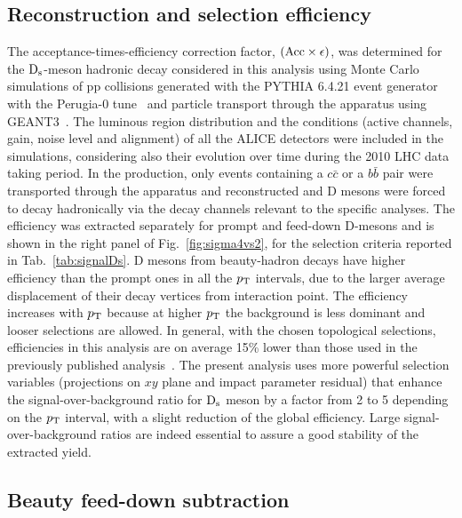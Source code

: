\subsection{Reconstruction and selection efficiency}
\label{sec:Effpp}
The acceptance-times-efficiency correction factor, 
$(\rm Acc \times \epsilon)$, was determined for the ${\rm D_s}$-meson
hadronic decay considered in this analysis using Monte Carlo simulations 
of pp collisions generated with the PYTHIA 6.4.21 event generator~\cite{Sjostrand:2006za} with the 
Perugia-0 tune~\cite{Skands:2010ak} and particle transport through the apparatus 
using GEANT3~\cite{Brun:1994aa}.
The luminous region distribution and the conditions (active channels, gain, 
noise level and alignment) of all the ALICE detectors were included in the 
simulations, considering also their evolution over time during the 2010 LHC 
data taking period.
In the production, only events containing a $c\bar{c}$ or a $b\bar{b}$ pair 
were transported through the apparatus and reconstructed and
D mesons were forced to decay hadronically via the decay channels relevant to
the specific analyses.
The efficiency was extracted separately for prompt and feed-down D-mesons and 
is shown in the right panel of Fig.~\ref{fig:sigma4vs2}, for the selection criteria
reported in Tab.~\ref{tab:signalDs}.
D mesons from beauty-hadron decays have higher efficiency than
the prompt ones in all the $p_{\rm T}$ intervals, due to the larger average displacement of their 
decay vertices from interaction point.
The efficiency increases with $p_{\rm T}$ because at higher $p_{\rm T}$ 
the background is less dominant and looser selections are allowed. 
In general, with the chosen topological selections, efficiencies in this analysis
are on average 15\% lower than those used in the previously published analysis~\cite{Abelev:2012tca}. 
The present analysis uses more powerful selection variables 
(projections on $xy$ plane and impact parameter residual) that
enhance the signal-over-background ratio for ${\rm D_s}$ meson by a factor 
from 2 to 5 depending on the $p_{\rm T}$ interval, with a slight reduction
of the global efficiency. Large signal-over-background ratios are indeed essential 
to assure a good stability of the extracted yield.

\subsection{Beauty feed-down subtraction}

